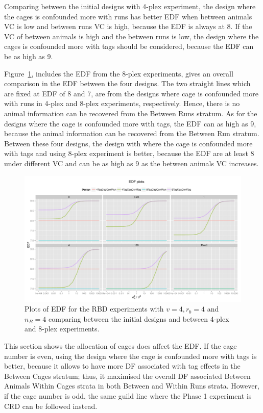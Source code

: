 \documentclass[12pt,a4paper]{article}
\begin{document}
Comparing between the initial designs with 4-plex experiment, the design where the cages is confounded more with runs has better EDF when between animals VC is low and between runs VC is high, because the EDF is always at 8. If the VC of between animals is high and the between runs is low, the design where the cages is confounded more with tags should be considered, because the EDF can be as high as 9.

Figure~\ref{fig:RBD442Tag4vsTag8}, includes the EDF from the 8-plex experiments, gives an overall comparison in the EDF between the four designs. The two straight lines which are fixed at EDF of 8 and 7, are from the designs where cage is confounded more with runs in 4-plex and 8-plex experiments, respectively. Hence, there is no animal information can be recovered from the Between Runs stratum. As for the designs where the cage is confounded more with tags, the EDF can as high as 9, because the animal information can be recovered from the Between Run stratum. Between these four designs, the design with  where the cage is confounded more with tags and using 8-plex experiment is better, because the EDF are at least 8 under different VC and can be as high as 9 as the between animals VC increases.    

\begin{figure}[ht]
\centering
\includegraphics[width=1 \textwidth]{Graph/RBD442Tag4vsTag8.pdf}
\caption{Plots of EDF for the RBD experiments with $v = 4, r_b = 4$ and $n_B = 4$ comparing between the initial designs and between 4-plex and 8-plex experiments.}
\label{fig:RBD442Tag4vsTag8}
\end{figure}

This section shows the allocation of cages does affect the EDF. If the cage number is even, using the design where the cage is confounded more with tags is better, because it allows to have more DF associated with tag effects in the Between Cages stratum; thus, it maximised the overall DF associated Between Animals Within Cages strata in both Between and Within Runs strata. However, if the cage number is odd, the same guild line where the Phase 1 experiment is CRD can be followed instead.  
\end{document}
